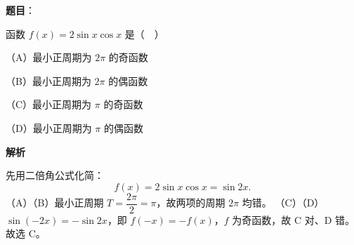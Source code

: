 \begin{answer}

\textbf{题目}：

函数 $f(x)=2\sin x\cos x$ 是（　）

（A）最小正周期为 $2\pi$ 的奇函数

（B）最小正周期为 $2\pi$ 的偶函数

（C）最小正周期为 $\pi$ 的奇函数

（D）最小正周期为 $\pi$ 的偶函数

\textbf{解析}

先用二倍角公式化简：
\nopagebreak[4]
\[f(x)=2\sin x\cos x=\sin 2x.\]
（A）（B）最小正周期 $T=\dfrac{2\pi}{2}=\pi$，故两项的周期 $2\pi$ 均错。
（C）（D）$\sin(-2x)=-\sin 2x$，即 $f(-x)=-f(x)$，$f$ 为奇函数，故 C 对、D 错。
故选 C。


\end{answer}
